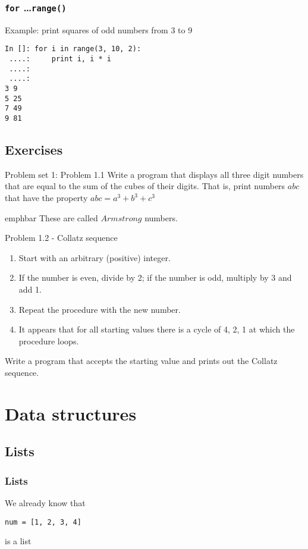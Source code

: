 \documentclass[14pt,compress]{beamer}
\newcommand{\emphbar}[1]
{\begin{beamercolorbox}[rounded=true]{emphbar} 
      {#1}
 \end{beamercolorbox}
}
\newcounter{time}
\newcommand{\inctime}[1]{\addtocounter{time}{#1}{\tiny \thetime\ m}}
\newcommand{\typ}[1]{\lstinline{#1}}
\begin{document}
\begin{frame}[fragile]
  \frametitle{\texttt{for} \ldots \typ{range()}}
Example: print squares of odd numbers from 3 to 9
  \begin{lstlisting}
In []: for i in range(3, 10, 2):
 ....:     print i, i * i
 ....:
 ....:
3 9
5 25
7 49
9 81
\end{lstlisting}
\inctime{5}
\end{frame}

\subsection{Exercises}

\begin{frame}{Problem set 1: Problem 1.1}
  Write a program that displays all three digit numbers that are equal to the sum of the cubes of their digits. That is, print numbers $abc$ that have the property $abc = a^3 + b^3 + c^3$\\
\vspace*{0.2in}
\emphbar{These are called $Armstrong$ numbers.}
\end{frame}

\begin{frame}{Problem 1.2 - Collatz sequence}
\begin{enumerate}
  \item Start with an arbitrary (positive) integer. 
  \item If the number is even, divide by 2; if the number is odd, multiply by 3 and add 1.
  \item Repeat the procedure with the new number.
  \item It appears that for all starting values there is a cycle of 4, 2, 1 at which the procedure loops.
\end{enumerate}
    Write a program that accepts the starting value and prints out the Collatz sequence.
\inctime{5}
\end{frame}

\section{Data structures}
\subsection{Lists}
\begin{frame}[fragile]
  \frametitle{Lists}
\begin{block}{We already know that}
  \begin{lstlisting}
num = [1, 2, 3, 4]
  \end{lstlisting}
is a list
\end{block}
\end{frame}
\end{document}
